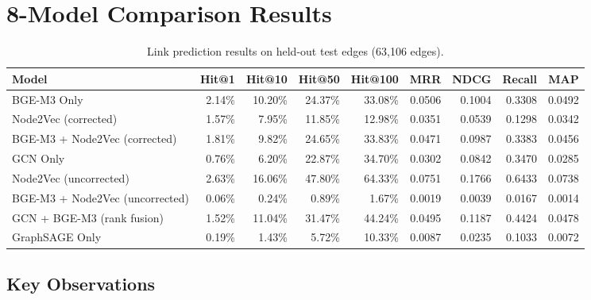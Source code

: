 \documentclass[12pt,a4paper]{article}
\begin{document}
\section{8-Model Comparison Results}

\begin{table}[H]
\centering
\caption{Link prediction results on held-out test edges (63,106 edges).}
\label{tab:comparison}
\begin{tabular}{lrrrrrrrr}
\toprule
\textbf{Model} & \textbf{Hit@1} & \textbf{Hit@10} & \textbf{Hit@50} & \textbf{Hit@100} & \textbf{MRR} & \textbf{NDCG} & \textbf{Recall} & \textbf{MAP} \\
\midrule
BGE-M3 Only & 2.14\% & 10.20\% & 24.37\% & 33.08\% & 0.0506 & 0.1004 & 0.3308 & 0.0492 \\
Node2Vec (corrected) & 1.57\% & 7.95\% & 11.85\% & 12.98\% & 0.0351 & 0.0539 & 0.1298 & 0.0342 \\
BGE-M3 + Node2Vec (corrected) & 1.81\% & 9.82\% & 24.65\% & 33.83\% & 0.0471 & 0.0987 & 0.3383 & 0.0456 \\
GCN Only & 0.76\% & 6.20\% & 22.87\% & 34.70\% & 0.0302 & 0.0842 & 0.3470 & 0.0285 \\
Node2Vec (uncorrected) & 2.63\% & 16.06\% & 47.80\% & 64.33\% & 0.0751 & 0.1766 & 0.6433 & 0.0738 \\
BGE-M3 + Node2Vec (uncorrected) & 0.06\% & 0.24\% & 0.89\% & 1.67\% & 0.0019 & 0.0039 & 0.0167 & 0.0014 \\
GCN + BGE-M3 (rank fusion) & 1.52\% & 11.04\% & 31.47\% & 44.24\% & 0.0495 & 0.1187 & 0.4424 & 0.0478 \\
GraphSAGE Only & 0.19\% & 1.43\% & 5.72\% & 10.33\% & 0.0087 & 0.0235 & 0.1033 & 0.0072 \\
\bottomrule
\end{tabular}
\end{table}

\subsection{Key Observations}
\end{document}
